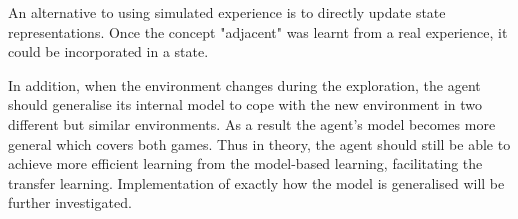 An alternative to using simulated experience is to directly update state representations. Once the concept "adjacent"  was learnt from a real experience, it could be incorporated in a state.

In addition, when the environment changes during the exploration, the agent should generalise its internal model to cope with the new environment in two different but similar environments.  As a result the agent's model becomes more general which covers both games. Thus in theory, the agent should still be able to achieve more efficient learning from the model-based learning, facilitating the transfer learning.
Implementation of exactly how the model is generalised will be further investigated.
